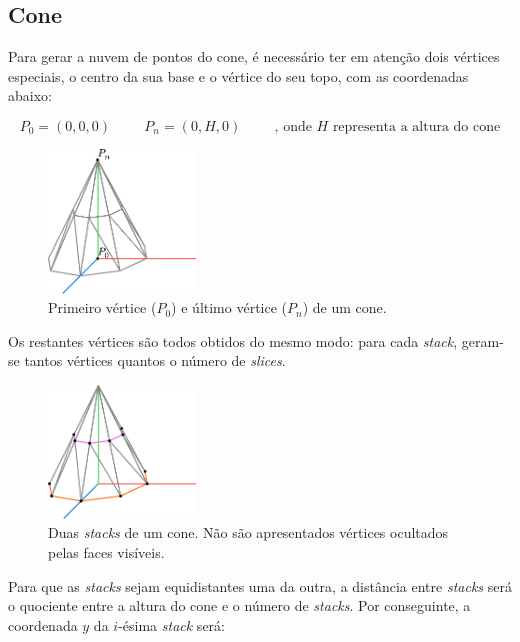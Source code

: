\documentclass[12pt, a4paper]{article}
\begin{document}
\subsection{Cone}

Para gerar a nuvem de pontos do cone, é necessário ter em atenção dois vértices especiais, o centro
da sua base e o vértice do seu topo, com as coordenadas abaixo:

$$
P_0 = (0, 0, 0)
\hspace{1cm}
P_n = (0, H, 0)
\hspace{1cm}
\text{, onde $H$ representa a altura do cone}
$$

\begin{figure}[H]
    \centering
    \includegraphics[width=0.35\textwidth]{res/figures/Cone1.pdf}
    \caption{Primeiro vértice ($P_0$) e último vértice ($P_n$) de um cone.}
\end{figure}

Os restantes vértices são todos obtidos do mesmo modo: para cada \emph{stack}, geram-se tantos
vértices quantos o número de \emph{slices}.

\begin{figure}[H]
    \centering
    \includegraphics[width=0.35\textwidth]{res/figures/Cone2.pdf}
    \caption{
        Duas \emph{stacks} de um cone. Não são apresentados vértices ocultados pelas faces visíveis.
    }
\end{figure}

Para que as \emph{stacks} sejam equidistantes uma da outra, a distância entre \emph{stacks} será
o quociente entre a altura do cone e o número de \emph{stacks}. Por conseguinte, a coordenada $y$ da
$i$-ésima \emph{stack} será:
\end{document}
